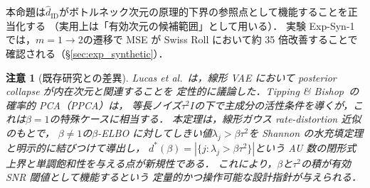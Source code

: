 \documentclass[11pt,a4paper]{jsarticle}
\newtheorem{remark}{注意}
\begin{document}
本命題は$\hat{d}_\mathrm{ID}$がボトルネック次元の原理的下界の参照点として機能することを正当化する
（実用上は「有効次元の候補範囲」として用いる）．
実験 Exp-Syn-1 では，$m = 1 \to 2$の遷移で MSE が Swiss Roll において約 35 倍改善することで確認される（§\ref{sec:exp_synthetic}）．

\begin{remark}[既存研究との差異]
Lucas et al.~\cite{lucas2019elbo}は，線形 VAE において posterior collapse が内在次元と関連することを
定性的に議論した．Tipping \& Bishop~\cite{tippingbishop1999ppca}の確率的 PCA（PPCA）は，
等長ノイズ$\tau^2 I$の下で主成分の活性条件を導くが，これは$\beta = 1$の特殊ケースに相当する．
本定理は，線形ガウス rate-distortion 近似のもとで，
$\beta \neq 1$の$\beta$-ELBO に対してしきい値$\lambda_j > \beta\tau^2$を
Shannon の水充填定理\cite{cover2006elements}と明示的に結びつけて導出し，
$d^*(\beta) = |\{j:\lambda_j > \beta\tau^2\}|$という AU 数の閉形式上界と単調飽和性を与える点が新規性である．
これにより，$\beta$と$\tau^2$の積が有効 SNR 閾値として機能するという
定量的かつ操作可能な設計指針が与えられる．
\end{remark}
\end{document}

